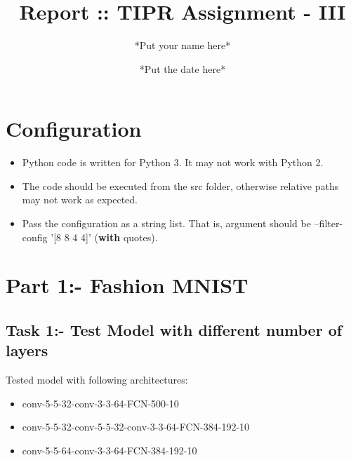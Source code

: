 \documentclass{article}
\title{Report :: TIPR Assignment - III}
\author{*Put your name here*}
\date{*Put the date here*}
\begin{document}
\maketitle

\section{Configuration}
\begin{itemize}
	\item Python code is written for Python 3. It may not work with Python 2.
	\item The code should be executed from the src folder, otherwise relative paths may not work as expected.
	\item Pass the configuration as a string list. That is, argument should be --filter-config '[8 8 4 4]' (\textbf{with} quotes).
\end{itemize}

\section{Part 1:- Fashion MNIST}
\subsection{Task 1:- Test Model with different number of layers}
Tested model with following architectures:
\begin{itemize}
	\item conv-5-5-32-conv-3-3-64-FCN-500-10
	\item conv-5-5-32-conv-5-5-32-conv-3-3-64-FCN-384-192-10
	\item conv-5-5-64-conv-3-3-64-FCN-384-192-10
\end{itemize}
\end{document}
